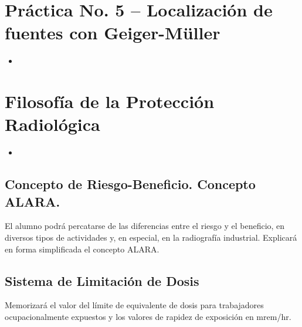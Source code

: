 \section{Práctica No. 5 -- Localización de fuentes con Geiger-Müller}
\begin{itemize}
  \item[(1:30 hr)]
\end{itemize}

\section{Filosofía de la Protección Radiológica}
\begin{itemize}
  \item[(2 hr)]
\end{itemize}

\subsection{Concepto de Riesgo-Beneficio. Concepto ALARA.}
El alumno podrá percatarse de las diferencias entre el riesgo y el beneficio, en diversos tipos de actividades y, en especial, en la radiografía industrial. Explicará en forma simplificada el concepto ALARA.

\subsection{Sistema de Limitación de Dosis}
Memorizará el valor del límite de equivalente de dosis para trabajadores ocupacionalmente expuestos y los valores de rapidez de exposición en mrem/hr.
